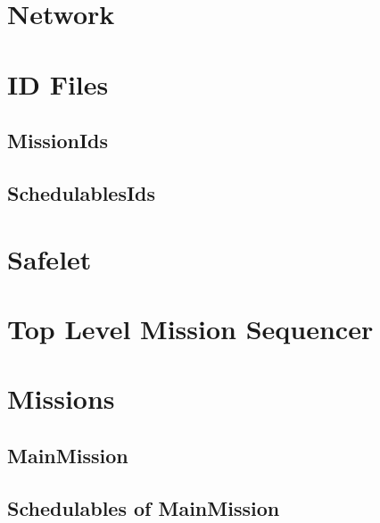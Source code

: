 \documentclass[10pt,a4paper]{article}
\begin{document}
\section{Network}

\newpage

\section{ID Files}
\subsection{MissionIds}


\subsection{SchedulablesIds}

\newpage

\section{Safelet}

\newpage

\section{Top Level Mission Sequencer}

\newpage

\section{Missions}


\subsection{MainMission}

\newpage

\subsection{Schedulables of MainMission}


\newpage


\newpage


\newpage


\newpage


\end{document}
